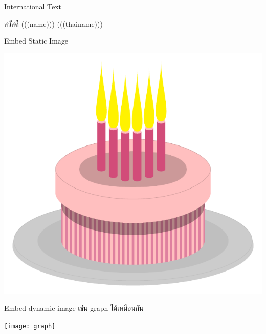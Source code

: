 \documentclass[12pt]{article}
\begin{document}
International Text

สวัสดี (((name))) (((thainame)))

Embed Static Image

\begin{center}
\includegraphics[width=0.7\linewidth]{assets/birthday-cake}
\end{center}

Embed dynamic image เช่น graph ได้เหมือนกัน
\begin{center}
	\texttt{[image: graph]}
\end{center}
\end{document}
